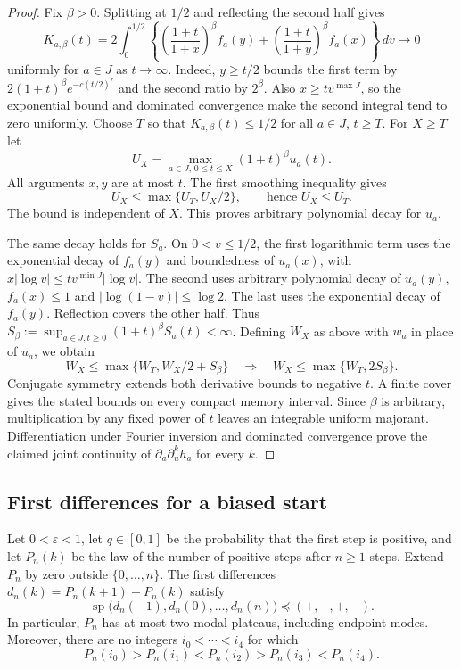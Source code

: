 \begin{proof}
Fix $\beta>0$. Splitting at $1/2$ and reflecting the second half gives
\[
 K_{a,\beta}(t)=2\int_0^{1/2}
 \left\{\left(\frac{1+t}{1+x}\right)^\beta f_a(y)
       +\left(\frac{1+t}{1+y}\right)^\beta f_a(x)\right\}\,dv
 \longrightarrow0
\]
uniformly for $a\in J$ as $t\to\infty$.
Indeed, $y\ge t/2$ bounds the first term by
$2(1+t)^\beta e^{-c(t/2)^r}$ and the second ratio by $2^\beta$.
Also $x\ge tv^{\max J}$, so the exponential bound and dominated
convergence make the second integral tend to zero uniformly.
Choose $T$ so that $K_{a,\beta}(t)\le1/2$ for all $a\in J$, $t\ge T$.
For $X\ge T$ let
\[
 U_X=\max_{a\in J,\,0\le t\le X}(1+t)^\beta u_a(t).
\]
All arguments $x,y$ are at most $t$. The first smoothing inequality gives
\[
 U_X\le\max\{U_T,U_X/2\},\qquad\text{hence }U_X\le U_T.
\]
The bound is independent of $X$. This proves arbitrary polynomial decay for $u_a$.

The same decay holds for $S_a$. On $0<v\le1/2$, the first
logarithmic term uses the exponential decay of $f_a(y)$ and boundedness
of $u_a(x)$, with $x|\log v|\le tv^{\min J}|\log v|$.
The second uses arbitrary polynomial decay of $u_a(y)$,
$f_a(x)\le1$ and $|\log(1-v)|\le\log2$. The last uses the
exponential decay of $f_a(y)$. Reflection covers the other half.
Thus $S_\beta:=\sup_{a\in J,t\ge0}(1+t)^\beta S_a(t)<\infty$.
Defining $W_X$ as above with $w_a$ in place of $u_a$, we obtain
\[
 W_X\le\max\{W_T,W_X/2+S_\beta\}
 \quad\Longrightarrow\quad W_X\le\max\{W_T,2S_\beta\}.
\]
Conjugate symmetry extends both derivative bounds to negative $t$.
A finite cover gives the stated bounds on every compact memory interval.
Since $\beta$ is arbitrary, multiplication by any fixed power of $t$
leaves an integrable uniform majorant. Differentiation under Fourier
inversion and dominated convergence prove the claimed joint continuity
of $\partial_a\partial_u^k h_a$ for every $k$.
\end{proof}


\subsection{First differences for a biased start}

\begin{proposition}\label{prop:all-bias-modes}
Let $0<\varepsilon<1$, let $q\in[0,1]$ be the probability that the first
step is positive, and let $P_n(k)$ be the law of the number of positive
steps after $n\ge1$ steps. Extend $P_n$ by zero outside $\{0,\ldots,n\}$.
The first differences $d_n(k)=P_n(k+1)-P_n(k)$ satisfy
\[
 \operatorname{sp}\bigl(d_n(-1),d_n(0),\ldots,d_n(n)\bigr)
 \preceq (+,-,+,-).
\]
In particular, $P_n$ has at most two modal plateaus, including endpoint
modes. Moreover, there are no integers $i_0<\cdots<i_4$ for which
\[
 P_n(i_0)>P_n(i_1)<P_n(i_2)>P_n(i_3)<P_n(i_4).
\]
\end{proposition}

